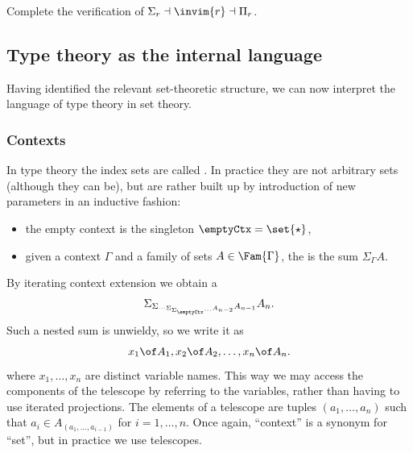 \begin{exercise}
  Complete the verification of $\Sigma_r \dashv \invim{r} \dashv \Pi_r$.
\end{exercise}

\subsection{Type theory as the internal language}
\label{sec:interpr-type-theory}

Having identified the relevant set-theoretic structure, we can now interpret the language of type theory in set theory.

\subsubsection{Contexts}
\label{sec:contexts}

In type theory the index sets are called . In practice they are not arbitrary sets (although they can be), but are rather built up by introduction of new parameters in an inductive fashion:
%
\begin{itemize}
\item the empty context is the singleton $\emptyCtx = \set{\star}$,
\item given a context $\Gamma$ and a family of sets $A \in \Fam{\Gamma}$, the  is the sum $\Sigma_\Gamma A$.
\end{itemize}

By iterating context extension we obtain a 
%
\begin{equation*}
  \Sigma_{\Sigma_{\cdots \Sigma_{\Sigma_{\emptyCtx} \cdots} A_{n-2}} A_{n-1}} A_n.
\end{equation*}
%
Such a nested sum is unwieldy, so we write it as
%
\begin{equation*}
  x_1 \of A_1, x_2 \of A_2, \ldots, x_n \of A_n.
\end{equation*}
%
where $x_1, \ldots, x_n$ are distinct variable names. This way we may access the components of the telescope by referring to the variables, rather than having to use iterated projections.
%
The elements of a telescope are tuples $(a_1, \ldots, a_n)$ such that $a_i \in A_{(a_1, \ldots, a_{i-1})}$ for $i = 1, \ldots, n$.
%
Once again, ``context'' is a synonym for ``set'', but in practice we use telescopes.

